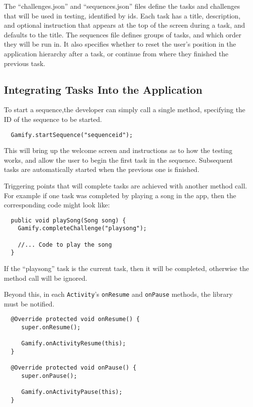 The ``challenges.json'' and ``sequences.json'' files define the tasks and
challenges that will be used in testing, identified by ids. Each task has a title, description, and optional instruction that appears at the top of the screen during a task, and defaults to the title. The sequences file defines groups of tasks, and which order they will be run in. It also specifies whether to reset the user's position in the application hierarchy after a task, or continue from where they finished the previous task.

\subsection{Integrating Tasks Into the Application}

To start a sequence,the developer can simply call a single method, specifying the ID of the sequence
to be started.

\begin{verbatim}
  Gamify.startSequence("sequenceid");
\end{verbatim}

This will bring up the welcome screen and instructions as to how the testing works,
and allow the user to begin the first task in the sequence. Subsequent tasks are
automatically started when the previous one is finished.

Triggering points that will complete tasks are achieved with another method
call. For example if one task was completed by playing a song in the app, then
the corresponding code might look like:

\begin{verbatim}
  public void playSong(Song song) {
    Gamify.completeChallenge("playsong");

    //... Code to play the song
  }
\end{verbatim}

If the ``playsong'' task is the current task, then it will be completed,
otherwise the method call will be ignored.

Beyond this, in each \verb|Activity|'s \verb|onResume| and \verb|onPause|
methods, the library must be notified.

\begin{verbatim}
  @Override protected void onResume() {
     super.onResume();

     Gamify.onActivityResume(this);
  }

  @Override protected void onPause() {
     super.onPause();

     Gamify.onActivityPause(this);
  }
\end{verbatim}

